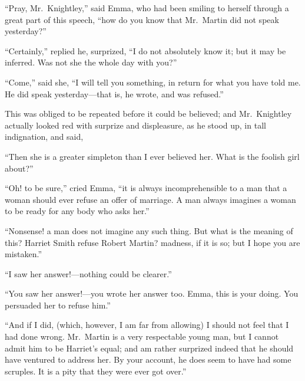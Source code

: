``Pray, Mr.\ Knightley,'' said Emma, who had been smiling to herself
through a great part of this speech, ``how do you know that Mr.\ Martin
did not speak yesterday?''

``Certainly,'' replied he, surprized, ``I do not absolutely know it;
but it may be inferred.  Was not she the whole day with you?''

``Come,'' said she, ``I will tell you something, in return for what
you have told me.  He did speak yesterday---that is, he wrote,
and was refused.''

This was obliged to be repeated before it could be believed;
and Mr.\ Knightley actually looked red with surprize and displeasure,
as he stood up, in tall indignation, and said,

``Then she is a greater simpleton than I ever believed her.
What is the foolish girl about?''

``Oh! to be sure,'' cried Emma, ``it is always incomprehensible
to a man that a woman should ever refuse an offer of marriage.
A man always imagines a woman to be ready for any body who asks her.''

``Nonsense! a man does not imagine any such thing.  But what is
the meaning of this? Harriet Smith refuse Robert Martin? madness,
if it is so; but I hope you are mistaken.''

``I saw her answer!---nothing could be clearer.''

``You saw her answer!---you wrote her answer too.  Emma, this is
your doing.  You persuaded her to refuse him.''

``And if I did, (which, however, I am far from allowing) I should
not feel that I had done wrong.  Mr.\ Martin is a very respectable
young man, but I cannot admit him to be Harriet's equal; and am
rather surprized indeed that he should have ventured to address her.
By your account, he does seem to have had some scruples.  It is
a pity that they were ever got over.''

